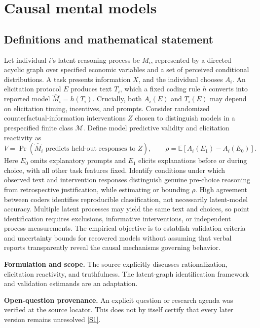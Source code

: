 \documentclass[11pt]{article}
\newcommand{\sref}[2]{\hyperlink{source:#1:#2}{[S#2]}}
\begin{document}
\section*{Causal mental models}\label{30007586}
\subsection{Definitions and mathematical statement}
Let individual \(i\)'s latent reasoning process be \(M_i\), represented by a directed acyclic graph over specified economic variables and a set of perceived conditional distributions. A task presents information \(X\), and the individual chooses \(A_i\). An elicitation protocol \(E\) produces text \(T_i\), which a fixed coding rule \(h\) converts into reported model \(\widehat M_i=h(T_i)\). Crucially, both \(A_i(E)\) and \(T_i(E)\) may depend on elicitation timing, incentives, and prompts. Consider randomized counterfactual-information interventions \(Z\) chosen to distinguish models in a prespecified finite class \(\mathcal M\). Define model predictive validity and elicitation reactivity as
\[V=\Pr(\widehat M_i\text{ predicts held-out responses to }Z),\qquad \rho=\mathbb E[A_i(E_1)-A_i(E_0)].\]
Here \(E_0\) omits explanatory prompts and \(E_1\) elicits explanations before or during choice, with all other task features fixed. Identify conditions under which observed text and intervention responses distinguish genuine pre-choice reasoning from retrospective justification, while estimating or bounding \(\rho\). High agreement between coders identifies reproducible classification, not necessarily latent-model accuracy. Multiple latent processes may yield the same text and choices, so point identification requires exclusions, informative interventions, or independent process measurements. The empirical objective is to establish validation criteria and uncertainty bounds for recovered models without assuming that verbal reports transparently reveal the causal mechanisms governing behavior.

\par\textbf{Formulation and scope.} The source explicitly discusses rationalization, elicitation reactivity, and truthfulness. The latent-graph identification framework and validation estimands are an adaptation.

\par\textbf{Open-question provenance.} An explicit question or research agenda was verified at the source locator. This does not by itself certify that every later version remains unresolved \sref{30007586}{1}.
\end{document}
